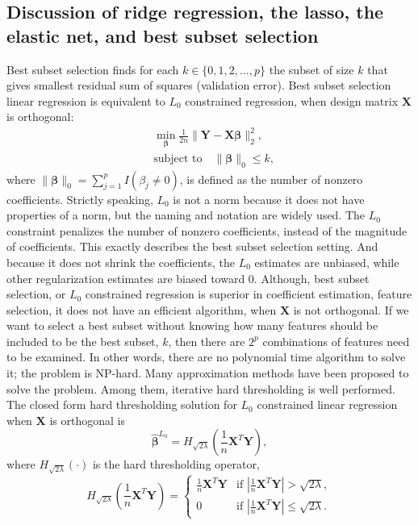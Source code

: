 \subsection{Discussion of ridge regression, the lasso, the elastic net, and best subset selection}
\label{comparison_reg}
Best subset selection finds for each $k\in\{0,1,2,\dots,p\}$ the subset of size $k$ that gives smallest residual sum of squares (validation error). Best subset selection linear regression is equivalent to $L_0$ constrained regression, when design matrix $\bm{X}$ is orthogonal:
\begin{equation}
\begin{aligned}
    &\min_{\bm{\beta}} \frac{1}{2n}\|\bm{Y}-\bm{X\beta}\|_2^2, \\
    &\text{subject to} \quad \|\bm{\beta}\|_0 \leq k, \label{eq1.12}
\end{aligned}
\end{equation}
where $\|\bm{\beta}\|_0=\sum_{j=1}^p I(\beta_j \neq 0)$, is defined as the number of nonzero coefficients. Strictly speaking, $L_0$ is not a norm because it does not have properties of a norm, but the naming and notation are widely used. The $L_0$ constraint penalizes the number of nonzero coefficients, instead of the magnitude of coefficients. This exactly describes the best subset selection setting. And because it does not shrink the coefficients, the $L_0$ estimates are unbiased, while other regularization estimates are biased toward 0. Although, best subset selection, or $L_0$ constrained regression is superior in coefficient estimation, feature selection, it does not have an efficient algorithm, when $\bm{X}$ is not orthogonal. If we want to select a best subset without knowing how many features should be included to be the best subset, $k$, then there are $2^p$ combinations of features need to be examined. In other words, there are no polynomial time algorithm to solve it; the problem is NP-hard. Many approximation methods have been proposed to solve the problem. Among them, iterative hard thresholding is well performed. The closed form hard thresholding solution for $L_0$ constrained linear regression when $\bm{X}$ is orthogonal is   
\begin{equation}
    \hat{\bm{\beta}}^{L_0}=H_{\sqrt{2\lambda}}(\frac{1}{n}\bm{X}^T\bm{Y}), \label{eq1.13}
\end{equation}
where $H_{\sqrt{2\lambda}}(\cdot)$ is the hard thresholding operator,
\begin{equation}
    H_{\sqrt{2\lambda}}(\frac{1}{n}\bm{X}^T\bm{Y})=
    \begin{cases}
        \frac{1}{n}\bm{X}^T\bm{Y} & \text{if $|\frac{1}{n}\bm{X}^T\bm{Y}|>\sqrt{2\lambda}$}, \\
        0 & \text{if $|\frac{1}{n}\bm{X}^T\bm{Y}|\leq\sqrt{2\lambda}$}.
    \end{cases}
\end{equation}
